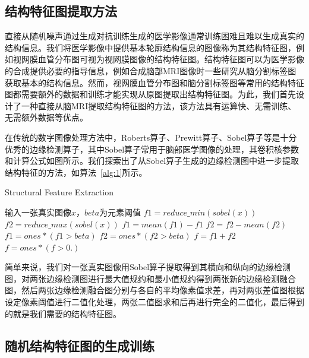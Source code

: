\documentclass[letterpaper]{article} %
\begin{document}
\subsection{结构特征图提取方法}

直接从随机噪声通过生成对抗训练生成的医学影像通常训练困难且难以生成真实的结构信息。我们将医学影像中提供基本轮廓结构信息的图像称为其结构特征图，例如视网膜血管分布图可视为视网膜图像的结构特征图\cite{41costa2017towards}。结构特征图可以为医学影像的合成提供必要的指导信息，例如合成脑部MRI图像时一些研究从脑分割标签图获取基本的结构信息\cite{4shin2018medical}。然而，视网膜血管分布图和脑分割标签图等常用的结构特征图都需要额外的数据和训练才能实现从原图提取出结构特征图。为此，我们首先设计了一种直接从脑MRI提取结构特征图的方法，该方法具有运算快、无需训练、无需额外数据等优点。

在传统的数字图像处理方法中，Roberts算子\cite{87Roberts}、Prewitt算子\cite{88prewitt}、Sobel算子\cite{89Sobel}等是十分优秀的边缘检测算子，其中Sobel算子常用于脑部医学图像的处理，其卷积核参数和计算公式如图所示。我们探索出了从Sobel算子生成的边缘检测图中进一步提取结构特征的方法，如算法~\ref{alg:1}所示。
\begin{algorithm}
	\caption{Structural Feature Extraction}
	\label{alg:1}
	\begin{algorithmic}[1]
		\State 输入一张真实图像$x$，$beta$为元素阈值
		\State $f1 = reduce\_min(sobel(x))$
		\State $f2 = reduce\_max(sobel(x))$
		\State $f1 = mean(f1) - f1$
		\State $f2 = f2 - mean(f2)$
		\State $f1 = ones * (f1 > beta)$
		\State $f2 = ones * (f2 > beta)$
		\State $f = f1 + f2$
		\State $f = ones * (f > 0.)$
	\end{algorithmic}  
\end{algorithm}

简单来说，我们对一张真实图像用Sobel算子提取得到其横向和纵向的边缘检测图，对两张边缘检测图进行最大值规约和最小值规约得到两张新的边缘检测融合图，然后两张边缘检测融合图分别与各自的平均像素值求差，再对两张差值图根据设定像素阈值进行二值化处理，两张二值图求和后再进行完全的二值化，最后得到的就是我们需要的结构特征图。

\subsection{随机结构特征图的生成训练}
\end{document}
